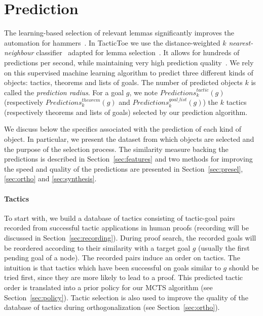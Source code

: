 \documentclass[runningheads,a4paper,draft]{svjour3}
\def\tactictoe{\textsf{TacticToe}\xspace}
\begin{document}
\section{Prediction}\label{s:prediction}
The learning-based selection of relevant lemmas significantly improves the
automation for hammers~\cite{BlanchetteGKKU16}. In \tactictoe we use the
distance-weighted \emph{$k$ nearest-neighbour} classifier~\cite{DudaniS76}
adapted for lemma selection~\cite{ckju-pxtp13}. It allows for hundreds of
predictions per second, while maintaining very high prediction quality~\cite{femalecop}.
We rely on this supervised machine learning algorithm to predict three
different kinds of objects:
 tactics, theorems and lists of goals. The number of predicted objects $k$ is
 called the \emph{prediction radius}. For a goal $g$, we note
$\mathit{Predictions}^{\mathit{tactic}}_k (g)$ (respectively
$\mathit{Predictions}^{\mathit{theorem}}_k (g)$
and $\mathit{Predictions}^{\mathit{goal\_list}}_k (g)$) the $k$ tactics
(respectively theorems and lists of goals) selected by our prediction algorithm.

We discuss below the specifics associated with the prediction of each kind of object.
In particular, we present the dataset from which objects are selected and the
purpose of the selection process. The similarity measure backing the
predictions is described in Section~\ref{sec:features} and two methods for
improving the speed and quality of the predictions are presented in
Section~\ref{sec:presel},\ref{sec:ortho} and \ref{sec:synthesis}.

\paragraph{Tactics}
To start with, we build a database of tactics consisting
of tactic-goal pairs recorded from successful tactic applications in human
proofs (recording will be discussed in
Section~\ref{sec:recording}).
During proof search, the recorded goals will be reordered according to their
similarity with a target goal $g$ (usually the first pending goal of a node).
The recorded pairs induce an
order on tactics. The intuition is that tactics which have been successful on
goals similar to $g$ should be tried first, since they are more likely to lead
to a proof.
This predicted tactic order is translated into a prior policy for our MCTS
algorithm (see Section~\ref{sec:policy}).
Tactic selection is also used to improve the quality of the database
of tactics during orthogonalization (see Section~\ref{sec:ortho}).
\end{document}
